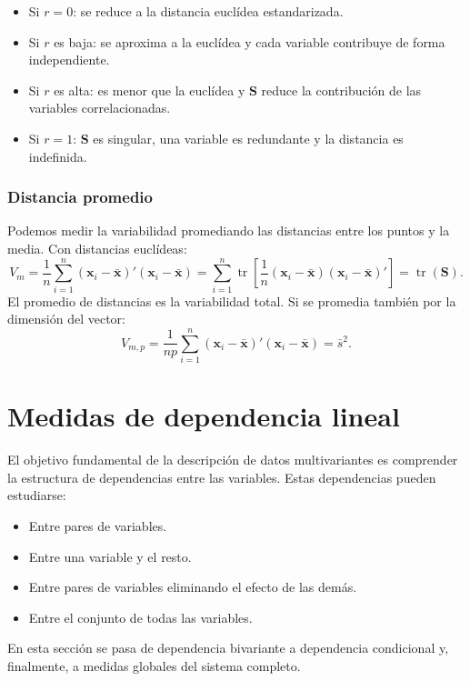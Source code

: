 \documentclass[12pt, a4paper]{article}
\theoremstyle{plain}
\theoremstyle{definition}
\theoremstyle{remark}
\newcommand{\mat}[1]{\mathbf{#1}}
\newcommand{\tr}{\operatorname{tr}}
\begin{document}
\begin{itemize}
  \item Si $r=0$: se reduce a la distancia euclídea estandarizada.
  \item Si $r$ es baja: se aproxima a la euclídea y cada variable contribuye
        de forma independiente.
  \item Si $r$ es alta: es menor que la euclídea y $\mat{S}$ reduce la
        contribución de las variables correlacionadas.
  \item Si $r=1$: $\mat{S}$ es singular, una variable es redundante y la
        distancia es indefinida.
\end{itemize}

\subsubsection{Distancia promedio}

Podemos medir la variabilidad promediando las distancias entre los puntos y la
media. Con distancias euclídeas:
\[
  V_m = \frac{1}{n}\sum_{i=1}^n (\mathbf{x}_i-\bar{\mathbf{x}})'(\mathbf{x}_i-\bar{\mathbf{x}})
  = \sum_{i=1}^n \tr\!\left[\frac{1}{n}(\mathbf{x}_i-\bar{\mathbf{x}})(\mathbf{x}_i-\bar{\mathbf{x}})'\right]
  = \tr(\mat{S}).
\]
El promedio de distancias es la variabilidad total. Si se promedia también por
la dimensión del vector:
\[
  V_{m,p} = \frac{1}{np}\sum_{i=1}^n (\mathbf{x}_i-\bar{\mathbf{x}})'(\mathbf{x}_i-\bar{\mathbf{x}}) = \bar{s}^2.
\]

\section{Medidas de dependencia lineal}

El objetivo fundamental de la descripción de datos multivariantes es
comprender la estructura de dependencias entre las variables. Estas
dependencias pueden estudiarse:
\begin{itemize}
  \item Entre pares de variables.
  \item Entre una variable y el resto.
  \item Entre pares de variables eliminando el efecto de las demás.
  \item Entre el conjunto de todas las variables.
\end{itemize}
En esta sección se pasa de dependencia bivariante a dependencia condicional y,
finalmente, a medidas globales del sistema completo.
\end{document}
